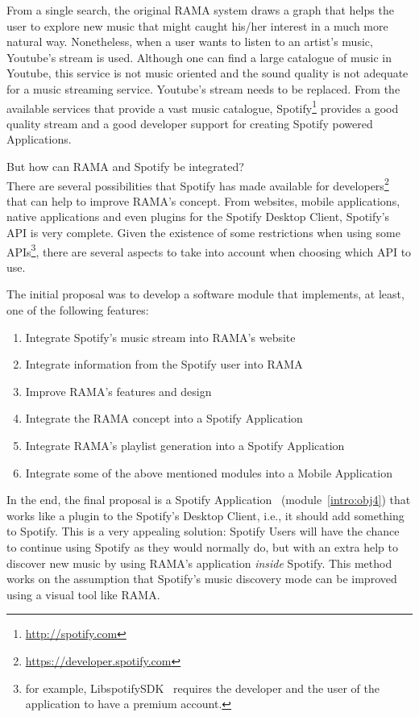 \documentclass[twocolumn]{article}
\begin{document}
  From a single search, the original RAMA system draws a graph that helps the user to explore new music that might caught his/her interest in a much more natural way.
  Nonetheless, when a user wants to listen to an artist's music, Youtube's stream is used.
  Although one can find a large catalogue of music in Youtube, this service is not music oriented and the sound quality is not adequate for a music streaming service.
  Youtube's stream needs to be replaced.
  From the available services that provide a vast music catalogue, Spotify\footnote{\url{http://spotify.com}} provides a good quality stream and a good developer support for creating Spotify powered Applications.

  But how can RAMA and Spotify be integrated? \\

  There are several possibilities that Spotify has made available for developers\footnote{\url{https://developer.spotify.com}} that can help to improve RAMA's concept.
  From websites, mobile applications, native applications and even plugins for the Spotify Desktop Client, Spotify's API is very complete.
  Given the existence of some restrictions when using some APIs\footnote{for example, LibspotifySDK~\cite{libspotifysdk} requires the developer and the user of the application to have a premium account.}, there are several aspects to take into account when choosing which API to use.

  The initial proposal was to develop a software module that implements, at least, one of the following features:

  \begin{enumerate}
    \item \label{intro:obj1} Integrate Spotify's music stream into RAMA's website
    \item \label{intro:obj2} Integrate information from the Spotify user into RAMA
    \item \label{intro:obj3} Improve RAMA's features and design
    \item \label{intro:obj4} Integrate the RAMA concept into a Spotify Application
    \item \label{intro:obj5} Integrate RAMA's playlist generation into a Spotify Application
    \item \label{intro:obj6} Integrate some of the above mentioned modules into a Mobile Application
  \end{enumerate}

  In the end, the final proposal is a Spotify Application~\cite{spotifyapps} (module~\ref{intro:obj4}) that works like a plugin to the Spotify's Desktop Client, i.e., it should add something to Spotify.
  This is a very appealing solution: Spotify Users will have the chance to continue using Spotify as they would normally do, but with an extra help to discover new music by using RAMA's application \emph{inside} Spotify. 
  This method works on the assumption that Spotify's music discovery mode can be improved using a visual tool like RAMA.
\end{document}
